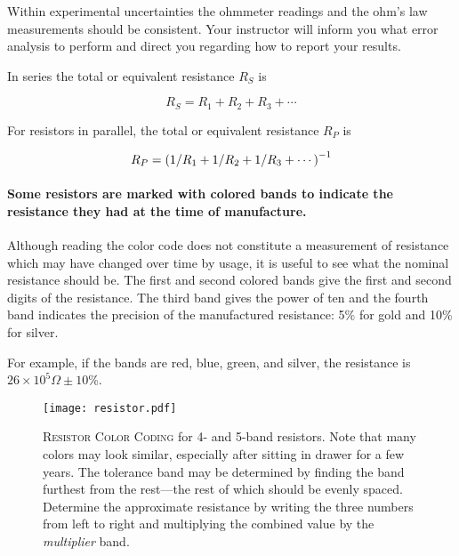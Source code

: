 Within experimental uncertainties the ohmmeter readings and the ohm's law measurements should be consistent.  Your instructor will inform you what error analysis to perform and direct you regarding how to report your results.

In series the total or equivalent resistance $R_S$ is 

\begin{equation} \label{e:ser}
	R_S  =  R_1  +  R_2  +  R_3  + \cdots	
\end{equation}

For resistors in parallel, the total or equivalent resistance $R_P$ is

\begin{equation} \label{e:par}
	R_P  =  \left (1/R_1  +  1/R_2  +  1/R_3  + \cdots \right)\relax^{-1}
\end{equation}

\paragraph {Some resistors are marked with colored bands to indicate the resistance they had at the time of manufacture.}  Although reading the color code does not constitute a measurement of resistance which may have changed over time by usage, it is useful to see what the nominal resistance should be.  The first and second colored bands give the first and second digits of the resistance.  The third band gives the power of ten and the fourth band indicates the precision of the manufactured resistance:  5\% for gold and  10\% for silver.

For example, if the bands are red, blue, green, and silver, the resistance is $26 \times 10^5\Omega\pm10$\%.
%

\begin{figure}
	\centering
	\texttt{[image: resistor.pdf]}
	\caption[Resistor Color Chart]{\textsc{Resistor Color Coding} for 4- and 5-band resistors.  Note that many colors may look similar, especially after sitting in drawer for a few years.  The tolerance band may be determined by finding the band furthest from the rest---the rest of which should be evenly spaced.  Determine the approximate resistance by writing the three numbers from left to right and multiplying the combined value by the \textit{multiplier} band.}
\end{figure}

